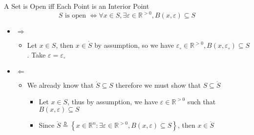 \documentclass{standalone}
\begin{document}
\begin{theo*}{A Set is Open iff Each Point is an Interior Point}
  \[
   S \text{ is open } \Leftrightarrow \forall x \in S, \exists \varepsilon \in \mathbb{R}^{>0} , B\left(x, \varepsilon\right) \subseteq S 
  \]
  \begin{pf}
    \begin{itemize}
      \item $ \Rightarrow $ 
        \begin{itemize}
          \item Let $ x \in S$, then $ x \in \mathring{S} $ by assumption, so we have $ \varepsilon_{ \circ} \in \mathbb{R}^{>0} , B\left(x, \varepsilon _{\circ}\right) \subseteq S$. Take $ \varepsilon  =  \varepsilon _{\circ}$
        \end{itemize}
      \item $ \Leftarrow $ 
        \begin{itemize}
          \item We already know that $ \mathring{S}  \subseteq S$ therefore we must show that $ S \subseteq \mathring{S} $
          \begin{itemize}
            \item Let $x \in S$, thus by assumption, we have $ \varepsilon  \in \mathbb{R}^{>0} $ such that $ B\left(x, \varepsilon \right) \subseteq S$ 
            \item Since $ \mathring{S} \stackrel{\mathtt{D}}{=} \left\{ x \in \mathbb{R}^{n} :\exists  \varepsilon \in \mathbb{R}^{>0}, B\left(x, \varepsilon \right) \subseteq S   \right\} $, then $ x \in \mathring{S} $ 
          \end{itemize}
        \end{itemize}
    \end{itemize}
    
  \end{pf}
\end{theo*}
\end{document}

